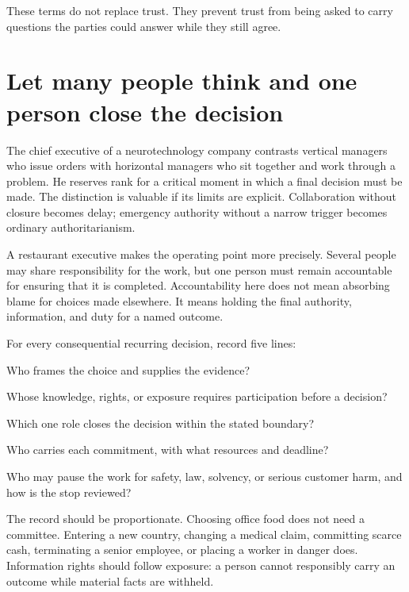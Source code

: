 These terms do not replace trust. They prevent trust from being asked to carry
questions the parties could answer while they still agree.

\section{Let many people think and one person close the decision}

The chief executive of a neurotechnology company contrasts vertical managers
who issue orders with horizontal managers who sit together and work through a
problem. He reserves rank for a critical moment in which a final decision must
be made. The distinction is valuable if its limits are explicit. Collaboration
without closure becomes delay; emergency authority without a narrow trigger
becomes ordinary authoritarianism.

A restaurant executive makes the operating point more precisely. Several
people may share responsibility for the work, but one person must remain
accountable for ensuring that it is completed. Accountability here does not
mean absorbing blame for choices made elsewhere. It means holding the final
authority, information, and duty for a named outcome.

For every consequential recurring decision, record five lines:

\begin{description}[leftmargin=2.75em,style=nextline]
\item[Propose] Who frames the choice and supplies the evidence?
\item[Consult] Whose knowledge, rights, or exposure requires participation
  before a decision?
\item[Decide] Which one role closes the decision within the stated boundary?
\item[Execute] Who carries each commitment, with what resources and deadline?
\item[Stop] Who may pause the work for safety, law, solvency, or serious customer
  harm, and how is the stop reviewed?
\end{description}

The record should be proportionate. Choosing office food does not need a
committee. Entering a new country, changing a medical claim, committing scarce
cash, terminating a senior employee, or placing a worker in danger does.
Information rights should follow exposure: a person cannot responsibly carry
an outcome while material facts are withheld.

